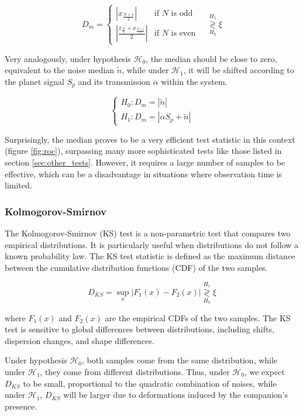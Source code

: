 \documentclass{article}
\begin{document}
$$
D_m = 
\begin{cases}
\left| x_{\frac{N+1}{2}} \right| & \text{if }N\text{ is odd} \\

\left| \frac{x_{\frac{N}{2}} + x_{\frac{N+1}{2}}}{2} \right|  & \text{if }N\text{ is even}
\end{cases}
\quad\stackrel{H_1}{\underset{H_0}{\gtrless}} \xi
$$

Very analogously, under hypothesis $\mathcal{H}_0$, the median should be close to zero, equivalent to the noise median $\tilde{n}$, while under $\mathcal{H}_1$, it will be shifted according to the planet signal $S_p$ and its transmission $\alpha$ within the system.

$$
\begin{cases}
H_0 : D_m = |\tilde{n}|\\
H_1 : D_m =  | \alpha S_p + \tilde{n} |
\end{cases}
$$

Surprisingly, the median proves to be a very efficient test statistic in this context (figure \ref{fig:roc}), surpassing many more sophisticated tests like those listed in section \ref{sec:other_tests}. However, it requires a large number of samples to be effective, which can be a disadvantage in situations where observation time is limited.

\subsubsection{Kolmogorov-Smirnov}

The Kolmogorov-Smirnov (KS) test is a non-parametric test that compares two empirical distributions. It is particularly useful when distributions do not follow a known probability law. The KS test statistic is defined as the maximum distance between the cumulative distribution functions (CDF) of the two samples.

$$
D_{KS} = \sup_x |F_1(x) - F_2(x)| \stackrel{H_1}{\underset{H_0}{\gtrless}} \xi
$$

where $F_1(x)$ and $F_2(x)$ are the empirical CDFs of the two samples. The KS test is sensitive to global differences between distributions, including shifts, dispersion changes, and shape differences.

Under hypothesis $\mathcal{H}_0$, both samples come from the same distribution, while under $\mathcal{H}_1$, they come from different distributions. Thus, under $\mathcal{H}_0$, we expect $D_{KS}$ to be small, proportional to the quadratic combination of noises, while under $\mathcal{H}_1$, $D_{KS}$ will be larger due to deformations induced by the companion's presence.
\end{document}
